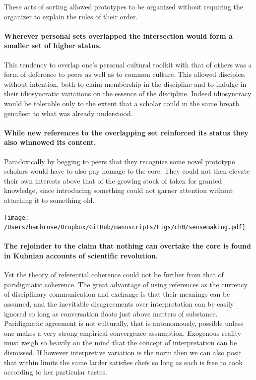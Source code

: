 \documentclass[]{article}
\begin{document}
These acts of sorting allowed prototypes to be organized without
requiring the organizer to explain the rules of their order.

\paragraph{Wherever personal sets overlapped the intersection would form
a smaller set of higher
status.}\label{wherever-personal-sets-overlapped-the-intersection-would-form-a-smaller-set-of-higher-status.}

This tendency to overlap one's personal cultural toolkit with that of
others was a form of deference to peers as well as to common culture.
This allowed disciples, without intention, both to claim membership in
the discipline and to indulge in their idiosyncratic variations on the
essence of the discipline. Indeed idiosyncracy would be tolerable only
to the extent that a scholar could in the same breath genuflect to what
was already understood.

\paragraph{While new references to the overlapping set reinforced its
status they also winnowed its
content.}\label{while-new-references-to-the-overlapping-set-reinforced-its-status-they-also-winnowed-its-content.}

Paradoxically by begging to peers that they recognize some novel
prototype scholars would have to also pay homage to the core. They could
not then elevate their own interests above that of the growing stock of
taken for granted knowledge, since introducing something could not
garner attention without attaching it to something old.

\texttt{[image: /Users/bambrose/Dropbox/GitHub/manuscripts/Figs/ch0/sensemaking.pdf]}

\paragraph{The rejoinder to the claim that nothing can overtake the core
is found in Kuhnian accounts of scientific
revolution.}\label{the-rejoinder-to-the-claim-that-nothing-can-overtake-the-core-is-found-in-kuhnian-accounts-of-scientific-revolution.}

Yet the theory of referential coherence could not be further from that
of paridigmatic coherence. The great advantage of using references as
the currency of disciplinary communication and exchange is that their
meanings can be assumed, and the inevitable disagreements over
interpretation can be easily ignored so long as conversation floats just
above matters of substance. Paridigmatic agreement is not culturally,
that is autonomously, possible unless one makes a very strong empirical
convergence assumption. Exogenous reality must weigh so heavily on the
mind that the concept of interpretation can be dismissed. If however
interpretive variation is the norm then we can also posit that within
limits the same larder satisfies chefs so long as each is free to cook
according to her particular tastes.
\end{document}
